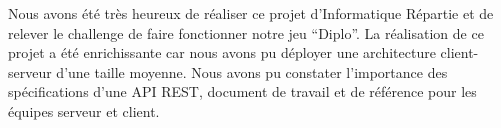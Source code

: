 Nous avons été très heureux de réaliser ce projet d'Informatique Répartie et de relever le challenge de faire fonctionner notre jeu \enquote{Diplo}. La réalisation de ce projet a été enrichissante car nous avons pu déployer une architecture client-serveur d'une taille moyenne. Nous avons pu constater l'importance des spécifications d'une API REST, document de travail et de référence pour les équipes serveur et client.
